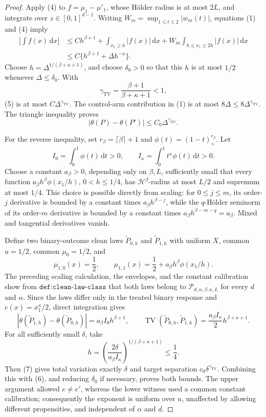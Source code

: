 \documentclass{article}
\begin{document}
\begin{proof}
Apply (4) to \(f=\mu_1-\mu'_1\), whose Hölder radius is at most \(2L\), and integrate over \(z\in[0,1]^{d-1}\).  Writing \(W_m=\sup_{1\leq t\leq2}|w_m(t)|\), equations (1) and (4) imply
\[
 \begin{aligned}
 \left|\int f(x)\,\mathrm dx\right|
 &\leq C h^{\beta+1}+\int_{x_1\geq h}|f(x)|\,\mathrm dx
      +W_m\int_{h\leq x_1\leq2h}|f(x)|\,\mathrm dx\\
 &\leq C\{h^{\beta+1}+\Delta h^{-\kappa}\}.
 \end{aligned}\tag{5}
\]
Choose \(h=\Delta^{1/(\beta+\kappa+1)}\), and choose \(\delta_0>0\) so that this \(h\) is at most \(1/2\) whenever \(\Delta\leq\delta_0\).  With
\[
 \gamma_{\mathrm{TV}}=\frac{\beta+1}{\beta+\kappa+1}<1,
\]
(5) is at most \(C\Delta^{\gamma_{\mathrm{TV}}}\).  The control-arm contribution in (1) is at most \(8\Delta\leq8\Delta^{\gamma_{\mathrm{TV}}}\).  The triangle inequality proves
\[
 |\theta(P)-\theta(P')|\leq C_0\Delta^{\gamma_{\mathrm{TV}}}. \tag{6}
\]

For the reverse inequality, set \(r_\beta=\lceil\beta\rceil+1\) and \(\phi(t)=(1-t)_+^{r_\beta}\).  Let
\[
 I_0=\int_0^1\phi(t)\,\mathrm dt>0,\qquad
 I_\kappa=\int_0^1t^\kappa\phi(t)\,\mathrm dt>0.
\]
Choose a constant \(a_\beta>0\), depending only on \(\beta,L\), sufficiently small that every function \(a_\beta h^\beta\phi(x_1/h)\), \(0<h\leq1/4\), has \(\mathcal H^\beta\)-radius at most \(L/2\) and supremum at most \(1/4\).  This choice is possible directly from scaling: for \(0\leq j\leq m\), its order-\(j\) derivative is bounded by a constant times \(a_\beta h^{\beta-j}\), while the \(q\)-Hölder seminorm of its order-\(m\) derivative is bounded by a constant times \(a_\beta h^{\beta-m-q}=a_\beta\).  Mixed and tangential derivatives vanish.

Define two binary-outcome clean laws \(\widetilde P_{0,h}\) and \(\widetilde P_{1,h}\) with uniform \(X\), common \(u=1/2\), common \(\mu_0=1/2\), and
\[
 \mu_{1,0}(x)=\frac12,\qquad
 \mu_{1,1}(x)=\frac12+a_\beta h^\beta\phi(x_1/h).
\]
The preceding scaling calculation, the envelopes, and the constant calibration show from \(\texttt{def:clean-law-class}\) that both laws belong to \(\mathcal P_{d,\alpha,\beta,\kappa,L}\) for every \(d\) and \(\alpha\).  Since the laws differ only in the treated binary response and \(e(x)=x_1^\kappa/2\), direct integration gives
\[
 |\theta(\widetilde P_{1,h})-\theta(\widetilde P_{0,h})|=a_\beta I_0h^{\beta+1},\qquad
 \operatorname{TV}(\widetilde P_{0,h},\widetilde P_{1,h})=\frac{a_\beta I_\kappa}{2}h^{\beta+\kappa+1}. \tag{7}
\]
For all sufficiently small \(\delta\), take
\[
 h=\left(\frac{2\delta}{a_\beta I_\kappa}\right)^{1/(\beta+\kappa+1)}\leq\frac14.
\]
Then (7) gives total variation exactly \(\delta\) and target separation \(c_0\delta^{\gamma_{\mathrm{TV}}}\).  Combining this with (6), and reducing \(\delta_0\) if necessary, proves both bounds.  The upper argument allowed \(e\neq e'\), whereas the lower witness used a common constant calibration; consequently the exponent is uniform over \(u\), unaffected by allowing different propensities, and independent of \(\alpha\) and \(d\).
\end{proof}
\end{document}
